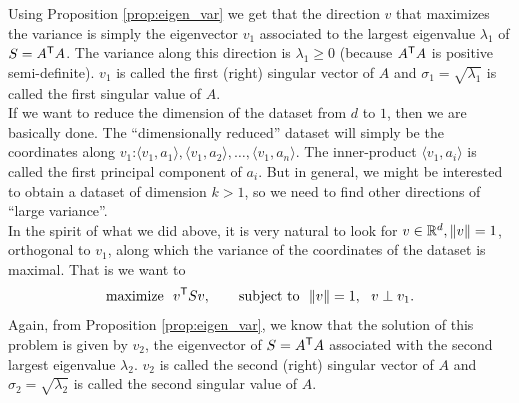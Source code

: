 \documentclass[11pt,nocut]{article}
\begin{document}
Using Proposition \ref{prop:eigen_var} we get that the direction $v$ that maximizes the variance is simply the eigenvector $v_1$ associated to the largest eigenvalue $\lambda_1$ of $S = A^{{\sf T}}A$. The variance along this direction is $\lambda_1 \geq 0$ (because $A^{{\sf T}}A$ is positive semi-definite).
$v_1$ is called the first (right) singular vector of $A$ and $\sigma_1 = \sqrt{\lambda_1}$ is called the first singular value of $A$.
\\

If we want to reduce the dimension of the dataset from $d$ to $1$, then we are basically done. The ``dimensionally reduced'' dataset will simply be the coordinates along $v_1$:$\langle v_1, a_1 \rangle, \langle v_1, a_2 \rangle, \dots, \langle v_1, a_n \rangle$.
The inner-product $\langle v_1, a_i \rangle$ is called the first principal component of $a_i$.
But in general, we might be interested to obtain a dataset of dimension $k >1$, so we need to find other directions of ``large variance''.
\\

In the spirit of what we did above, it is very natural to look for $v \in \mathbb{R}^d, \|v\| = 1$, orthogonal to $v_1$, along which the variance of the coordinates of the dataset is maximal.
That is we want to 
$$
\text{maximize} \ \ v^{\sT} S v, \qquad \text{subject to} \ \ \|v\| = 1, \ \ v \perp v_1.
$$
Again, from Proposition \ref{prop:eigen_var}, we know that the solution of this problem is given by $v_2$, the eigenvector of $S = A^{{\sf T}}A$ associated with the second largest eigenvalue $\lambda_2$.
$v_2$ is called the second (right) singular vector of $A$ and $\sigma_2 = \sqrt{\lambda_2}$ is called the second singular value of $A$.
\\
\end{document}
